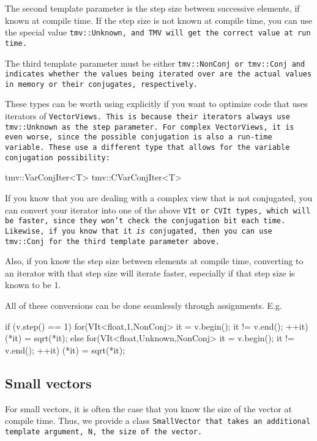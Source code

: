 The second template parameter is the step size between successive elements, if known at compile time.  If the step size is not known at compile time, you can use the special value \tt{tmv::Unknown}, and TMV will get the correct value at run time.  

The third template parameter must be either \tt{tmv::NonConj} or \tt{tmv::Conj} and indicates whether the values being iterated over are the actual values in memory or their conjugates, respectively.

These types can be worth using explicitly if you want to optimize code that uses iterators of \tt{VectorView}s.
This is because their iterators always use \tt{tmv::Unknown} as the step parameter.  For complex \tt{VectorView}s, it is even worse, since the possible conjugation is also a run-time variable.  These use a different type that allows for the variable conjugation possibility:
\begin{tmvcode}
tmv::VarConjIter<T>
tmv::CVarConjIter<T>
\end{tmvcode}

If you know that you are dealing with a complex view that is not conjugated, you can 
convert your iterator into one of the above \tt{VIt} or \tt{CVIt} types, which will be 
faster, since they won't check the conjugation bit each time. 
Likewise, if you
know that it {\em is} conjugated, then you can use \tt{tmv::Conj} for the 
third template parameter above.

Also, if you know the step size between elements at compile time, converting to 
an iterator with that step size will iterate faster, especially if that step size is known to be 1.

All of these conversions can be done seamlessly through assignments.  E.g.
\begin{tmvcode}
if (v.step() == 1)
    for(VIt<float,1,NonConj> it = v.begin(); it != v.end(); ++it)
        (*it) = sqrt(*it);
else 
    for(VIt<float,Unknown,NonConj> it = v.begin(); it != v.end(); ++it)
        (*it) = sqrt(*it);
\end{tmvcode}

\subsection{Small vectors}
\label{SmallVector}

For small vectors, it is often the case that you know the size of the vector
at compile time.  Thus, we provide a class \tt{SmallVector} that takes an
additional template argument, \tt{N}, the size of the vector.

